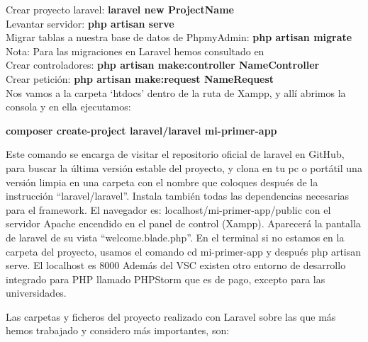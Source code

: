 \documentclass{article}
\begin{document}
\begin{enumerate}
Crear proyecto laravel:  \textbf{laravel new ProjectName}\\
Levantar servidor: \textbf{php artisan serve}\\
Migrar tablas a nuestra base de datos de PhpmyAdmin: \textbf{php artisan migrate}\\
Nota: Para las migraciones en Laravel hemos consultado en \cite{docLaravelmigrations}\\
Crear controladores: \textbf{php artisan make:controller NameController}\\
Crear petición: \textbf{php artisan make:request NameRequest}\\

Nos vamos a la carpeta ‘htdocs’ dentro de la ruta de Xampp, y allí abrimos la consola y en ella ejecutamos: 

\textbf{composer create-project laravel/laravel mi-primer-app}  

Este comando se encarga de visitar el repositorio oficial de laravel en GitHub, para buscar la última versión estable del proyecto, y clona en tu pc o portátil una versión limpia en una carpeta con el nombre que coloques después de la instrucción “laravel/laravel”.
Instala también todas las dependencias necesarias para el framework.
El navegador es: localhost/mi-primer-app/public con el servidor Apache encendido en el panel de control (Xampp). Aparecerá la pantalla de laravel de su vista “welcome.blade.php”.
En el terminal si no estamos en la carpeta del proyecto, usamos el comando cd mi-primer-app y después php artisan serve.
El localhost es 8000
Además del VSC existen otro entorno de desarrollo integrado para PHP llamado PHPStorm que es de pago, excepto para las universidades.


Las carpetas y ficheros del proyecto realizado con Laravel sobre las que más hemos trabajado y considero más importantes, son:


\end{enumerate}
\end{document}
